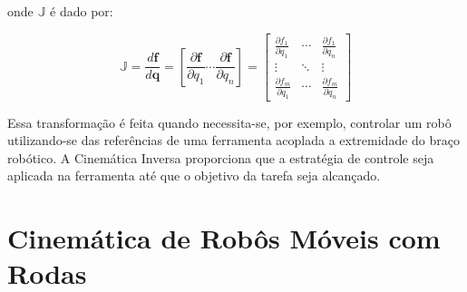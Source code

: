\noindent onde $\mathbb{J}$ é dado por:

\begin{equation*}
    \mathbb{J}
    =
    \frac{d \mathbf{f}}{d \mathbf{q}}
    =
    \left[ \frac{\partial \mathbf{f}}{\partial q_1}
        \cdots \frac{\partial \mathbf{f}}{\partial q_n} \right]
    =
    \begin{bmatrix}
        \frac{\partial f_1}{\partial q_1} & \cdots &
        \frac{\partial f_1}{\partial q_n}                   \\
        \vdots                            & \ddots & \vdots \\
        \frac{\partial f_m}{\partial q_1} & \cdots &
        \frac{\partial f_m}{\partial q_n}
    \end{bmatrix}
\end{equation*}

Essa transformação é feita quando necessita-se, por exemplo, controlar um robô utilizando-se das referências de uma ferramenta acoplada a
extremidade do braço robótico. A Cinemática Inversa proporciona que a estratégia de controle seja aplicada na ferramenta até
que o objetivo da tarefa seja alcançado.


    




\section{Cinemática de Robôs Móveis com Rodas}

